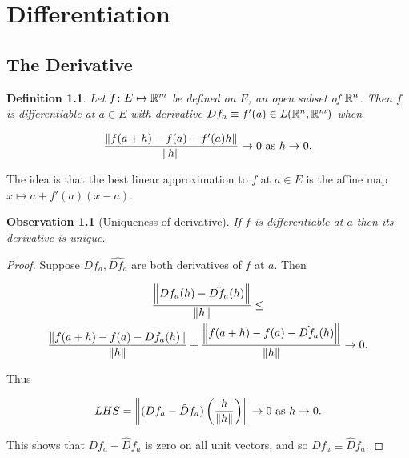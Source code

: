 \documentclass{notes}
\theoremstyle{plain}
\newtheorem{observation}[proposition]{Observation}
\newtheorem{definition}[proposition]{Definition}
\begin{document}




\chapter{Differentiation}

\section{The Derivative}

\begin{definition}
Let $ f\colon  E \mapsto \mathbb{R}^{m} $ be defined on $ E $, an open subset 
of $ \mathbb{R}^{n} $. Then $ f $ is \emph{differentiable} at $ a \in E 
$ with derivative $Df_{a}\equiv f'(a) \in L(\mathbb{R}^{n},\mathbb{R}^{m})$ when

\[
\frac{ \left\|f(a+h)-f(a)-f'(a)h\right\|}{\left\|h\right\|} \to 0 \text{ as } h \to 0. \]
\end{definition}

The idea is that the best linear approximation to $ f $ at $ a \in E $ is 
the affine map $x \mapsto a+f'(a)(x-a)$.

\begin{observation}[Uniqueness of derivative]
If $ f $ is differentiable at $ a $ then its derivative is 
unique.
\end{observation}

\begin{proof}
Suppose $ Df_{a}, \hat{Df_{a}} $ are both 
derivatives of $ f $ at $a$. Then

\begin{multline*}
\frac{\left\|Df_{a}(h) - \hat{Df_{a}}(h)\right\|}{\left\|h\right\|} \leq \\
\frac{ \left\|f(a+h)-f(a)-Df_{a}(h)\right\|}{\left\|h\right\|} +
\frac{ \left\|f(a+h)-f(a)-\hat{Df_{a}}(h)\right\|}{\left\|h\right\|} \to 0.
\end{multline*}

Thus

\[
LHS  = \left\|(Df_{a}-\hat{D}f_{a})\left(\frac{h}{\left\|h\right\|}\right)\right\| \to
 0 \text{ as } h \to 0.
\]

This shows that $ Df_{a}-\hat{D}f_{a} $ is zero on all unit vectors, 
and so $ Df_{a} \equiv \hat{D}f_{a} $.
\end{proof}
\end{document}
